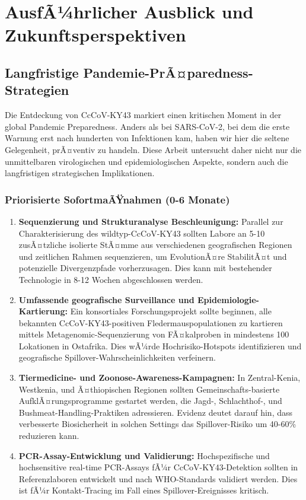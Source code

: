 ﻿\documentclass[11pt,a4paper]{article}
\theoremstyle{definition}
\begin{document}
\section{AusfÃ¼hrlicher Ausblick und Zukunftsperspektiven}

\subsection{Langfristige Pandemie-PrÃ¤paredness-Strategien}

Die Entdeckung von CcCoV-KY43 markiert einen kritischen Moment in der global Pandemic Preparedness. Anders als bei SARS-CoV-2, bei dem die erste Warnung erst nach hunderten von Infektionen kam, haben wir hier die seltene Gelegenheit, prÃ¤ventiv zu handeln. Diese Arbeit untersucht daher nicht nur die unmittelbaren virologischen und epidemiologischen Aspekte, sondern auch die langfristigen strategischen Implikationen.

\subsubsection{Priorisierte SofortmaÃŸnahmen (0-6 Monate)}

\begin{enumerate}
\item \textbf{Sequenzierung und Strukturanalyse Beschleunigung:} Parallel zur Charakterisierung des wildtyp-CcCoV-KY43 sollten Labore an 5-10 zusÃ¤tzliche isolierte StÃ¤mme aus verschiedenen geografischen Regionen und zeitlichen Rahmen sequenzieren, um EvolutionÃ¤re StabilitÃ¤t und potenzielle Divergenzpfade vorherzusagen. Dies kann mit bestehender Technologie in 8-12 Wochen abgeschlossen werden.

\item \textbf{Umfassende geografische Surveillance und Epidemiologie-Kartierung:} Ein konsortiales Forschungsprojekt sollte beginnen, alle bekannten CcCoV-KY43-positiven Fledermauspopulationen zu kartieren mittels Metagenomic-Sequenzierung von FÃ¤kalproben in mindestens 100 Lokationen in Ostafrika. Dies wÃ¼rde Hochrisiko-Hotspots identifizieren und geografische Spillover-Wahrscheinlichkeiten verfeinern.

\item \textbf{Tiermedicine- und Zoonose-Awareness-Kampagnen:} In Zentral-Kenia, Westkenia, und Ã¤thiopischen Regionen sollten Gemeinschafts-basierte AufklÃ¤rungsprogramme gestartet werden, die Jagd-, Schlachthof-, und Bushmeat-Handling-Praktiken adressieren. Evidenz deutet darauf hin, dass verbesserte Biosicherheit in solchen Settings das Spillover-Risiko um 40-60\% reduzieren kann.

\item \textbf{PCR-Assay-Entwicklung und Validierung:} Hochspezifische und hochsensitive real-time PCR-Assays fÃ¼r CcCoV-KY43-Detektion sollten in Referenzlaboren entwickelt und nach WHO-Standards validiert werden. Dies ist fÃ¼r Kontakt-Tracing im Fall eines Spillover-Ereignisses kritisch.
\end{enumerate}
\end{document}
